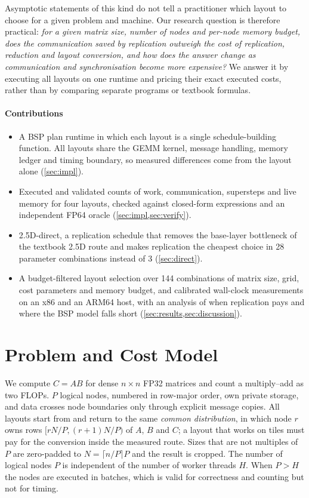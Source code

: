 \documentclass[11pt,a4paper]{article}
\begin{document}
Asymptotic statements of this kind do not tell a practitioner which layout to choose for a given problem
and machine. Our research question is therefore practical: \emph{for a given matrix size, number of
nodes and per-node memory budget, does the communication saved by replication outweigh the cost of
replication, reduction and layout conversion, and how does the answer change as communication and
synchronisation become more expensive?} We answer it by executing all layouts on one runtime and pricing
their exact executed costs, rather than by comparing separate programs or textbook formulas.

\paragraph{Contributions}
\begin{itemize}
\item A BSP plan runtime in which each layout is a single schedule-building function. All layouts share
      the GEMM kernel, message handling, memory ledger and timing boundary, so measured differences come
      from the layout alone (\cref{sec:impl}).
\item Executed and validated counts of work, communication, supersteps and live memory for four layouts,
      checked against closed-form expressions and an independent FP64 oracle (\cref{sec:impl,sec:verify}).
\item 2.5D-direct, a replication schedule that removes the base-layer bottleneck of the textbook 2.5D
      route and makes replication the cheapest choice in 28 parameter combinations instead of 3
      (\cref{sec:direct}).
\item A budget-filtered layout selection over 144 combinations of matrix size, grid, cost parameters and
      memory budget, and calibrated wall-clock measurements on an x86 and an ARM64 host, with an analysis
      of when replication pays and where the BSP model falls short (\cref{sec:results,sec:discussion}).
\end{itemize}

\section{Problem and Cost Model}
\label{sec:model}

We compute $C=AB$ for dense $n\times n$ FP32 matrices and count a multiply--add as two FLOPs. $P$ logical
nodes, numbered in row-major order, own private storage, and data crosses node boundaries only through
explicit message copies. All layouts start from and return to the same \emph{common distribution}, in
which node $r$ owns rows $[rN/P,(r+1)N/P)$ of $A$, $B$ and $C$; a layout that works on tiles must pay for
the conversion inside the measured route. Sizes that are not multiples of $P$ are zero-padded to
$N=\lceil n/P\rceil P$ and the result is cropped. The number of logical nodes $P$ is independent of the
number of worker threads $H$. When $P>H$ the nodes are executed in batches, which is valid for
correctness and counting but not for timing.
\end{document}
